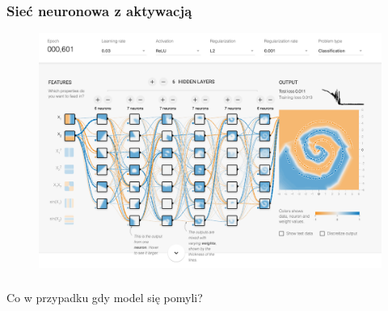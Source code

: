 \documentclass[smaller]{beamer}
\begin{document}
\begin{frame}
\frametitle{Sieć neuronowa z aktywacją}
\begin{figure}
    \centering
    \includegraphics[width=\textwidth,height=0.7\textheight,keepaspectratio]{../manifest/separation.png}
\end{figure}
\end{frame}


\begin{frame}
\frametitle{}

\begin{center}
\Huge Co w przypadku gdy model się pomyli?
\end{center}

\end{frame}

\end{document}
